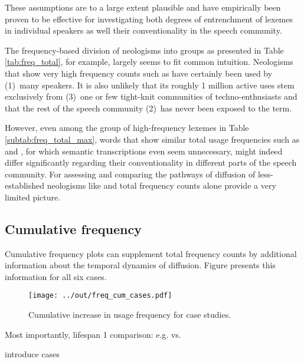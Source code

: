 \documentclass[a4paper, abstract=on]{scrartcl}
\begin{document}
    These assumptions are to a large extent plausible and have empirically been proven to be effective for investigating both degrees of entrenchment of lexemes in individual speakers as well their conventionality in the speech community.

    The frequency-based division of neologisms into groups as presented in Table \ref{tab:freq_total}, for example, largely seems to fit common intuition. Neologisms that show very high frequency counts such as  have certainly been used by (1)~many speakers. It is also unlikely that its roughly 1 million active uses stem exclusively from (3)~one or few tight-knit communities of techno-enthusiasts and that the rest of the speech community (2)~has never been exposed to the term.

    However, even among the group of high-frequency lexemes in Table \ref{subtab:freq_total_max}, words that show similar total usage frequencies such as  and , for which semantic transcriptions even seem unnecessary, might indeed differ significantly regarding their conventionality in different parts of the speech community. For assessing and comparing the pathways of diffusion of less-established neologisms like  and  total frequency counts alone provide a very limited picture.

  \subsection{Cumulative frequency}

    Cumulative frequency plots can supplement total frequency counts by additional information about the temporal dynamics of diffusion. Figure presents this information for all six cases.

    \begin{figure}
      \caption{Cumulative increase in usage frequency for case studies.\protect\footnotemark}
      \label{fig:freq_cum_cases}
      \texttt{[image: ../out/freq\_cum\_cases.pdf]}
      \centering
    \end{figure}

    Most importantly,
      lifespan
        1 comparison: e.g.  vs. 

    introduce cases
\end{document}
